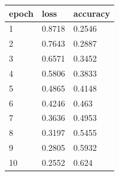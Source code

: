 \begin{tabular}{lll}
\hline
epoch & loss & accuracy \\
\hline
1 & 0.8718 & 0.2546 \\
2 & 0.7643 & 0.2887 \\
3 & 0.6571 & 0.3452 \\
4 & 0.5806 & 0.3833 \\
5 & 0.4865 & 0.4148 \\
6 & 0.4246 & 0.463 \\
7 & 0.3636 & 0.4953 \\
8 & 0.3197 & 0.5455 \\
9 & 0.2805 & 0.5932 \\
10 & 0.2552 & 0.624 \\
\hline
\end{tabular}
